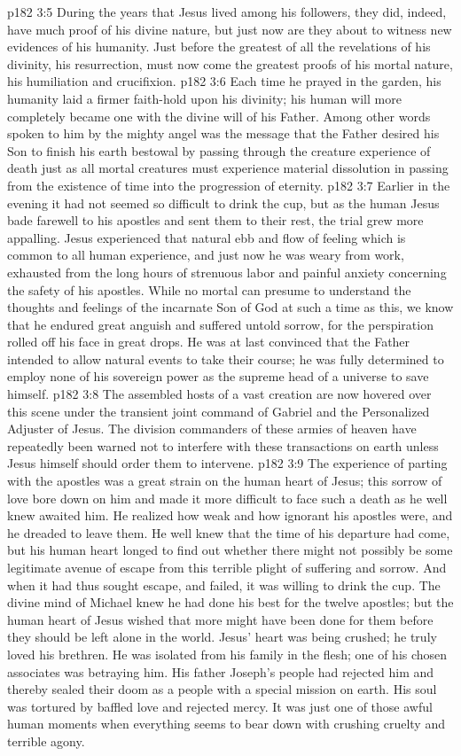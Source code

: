 \pc \vs p182 3:5 During the years that Jesus lived among his followers, they did, indeed, have much proof of his divine nature, but just now are they about to witness new evidences of his humanity. Just before the greatest of all the revelations of his divinity, his resurrection, must now come the greatest proofs of his mortal nature, his humiliation and crucifixion.
\vs p182 3:6 Each time he prayed in the garden, his humanity laid a firmer faith\hyp{}hold upon his divinity; his human will more completely became one with the divine will of his Father. Among other words spoken to him by the mighty angel was the message that the Father desired his Son to finish his earth bestowal by passing through the creature experience of death just as all mortal creatures must experience material dissolution in passing from the existence of time into the progression of eternity.
\vs p182 3:7 Earlier in the evening it had not seemed so difficult to drink the cup, but as the human Jesus bade farewell to his apostles and sent them to their rest, the trial grew more appalling. Jesus experienced that natural ebb and flow of feeling which is common to all human experience, and just now he was weary from work, exhausted from the long hours of strenuous labor and painful anxiety concerning the safety of his apostles. While no mortal can presume to understand the thoughts and feelings of the incarnate Son of God at such a time as this, we know that he endured great anguish and suffered untold sorrow, for the perspiration rolled off his face in great drops. He was at last convinced that the Father intended to allow natural events to take their course; he was fully determined to employ none of his sovereign power as the supreme head of a universe to save himself.
\vs p182 3:8 The assembled hosts of a vast creation are now hovered over this scene under the transient joint command of Gabriel and the Personalized Adjuster of Jesus. The division commanders of these armies of heaven have repeatedly been warned not to interfere with these transactions on earth unless Jesus himself should order them to intervene.
\pc \vs p182 3:9 The experience of parting with the apostles was a great strain on the human heart of Jesus; this sorrow of love bore down on him and made it more difficult to face such a death as he well knew awaited him. He realized how weak and how ignorant his apostles were, and he dreaded to leave them. He well knew that the time of his departure had come, but his human heart longed to find out whether there might not possibly be some legitimate avenue of escape from this terrible plight of suffering and sorrow. And when it had thus sought escape, and failed, it was willing to drink the cup. The divine mind of Michael knew he had done his best for the twelve apostles; but the human heart of Jesus wished that more might have been done for them before they should be left alone in the world. Jesus’ heart was being crushed; he truly loved his brethren. He was isolated from his family in the flesh; one of his chosen associates was betraying him. His father Joseph’s people had rejected him and thereby sealed their doom as a people with a special mission on earth. His soul was tortured by baffled love and rejected mercy. It was just one of those awful human moments when everything seems to bear down with crushing cruelty and terrible agony.

